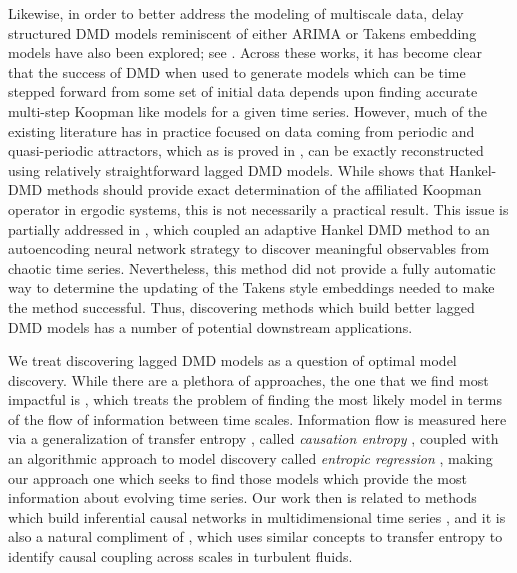 \documentclass[a4paper,11pt]{article}
\begin{document}
Likewise, in order to better address the modeling of multiscale data, delay structured DMD models reminiscent of either ARIMA or Takens embedding models have also been explored; see \cite{arbabi, clainche, duraisamy, champion2, kutz4, curtis_dldmd}.  Across these works, it has become clear that the success of DMD when used to generate models which can be time stepped forward from some set of initial data depends upon finding accurate multi-step Koopman like models for a given time series.  However, much of the existing literature has in practice focused on data coming from periodic and quasi-periodic attractors, which as is proved in \cite{duraisamy}, can be exactly reconstructed using relatively straightforward lagged DMD models.  While \cite{arbabi} shows that Hankel-DMD methods should provide exact determination of the affiliated Koopman operator in ergodic systems, this is not necessarily a practical result.  This issue is partially addressed in \cite{curtis_dldmd}, which coupled an adaptive Hankel DMD method to an autoencoding neural network strategy to discover meaningful observables from chaotic time series.  Nevertheless, this method did not provide a fully automatic way to determine the updating of the Takens style embeddings needed to make the method successful.  Thus, discovering methods which build better lagged DMD models has a number of potential downstream applications.  

We treat discovering lagged DMD models as a question of optimal model discovery.  While there are a plethora of approaches, the one that we find most impactful is \cite{bollt2}, which treats the problem of finding the most likely model in terms of the flow of information between time scales.  Information flow is measured here via a generalization of transfer entropy \cite{schreiber}, called {\it causation entropy} \cite{bollt}, coupled with an algorithmic approach to model discovery called {\it entropic regression} \cite{bollt2}, making our approach one which seeks to find those models which provide the most information about evolving time series.  Our work then is related to methods which build inferential causal networks in multidimensional time series \cite{idtxl2}, and it is also a natural compliment of \cite{lozano}, which uses similar concepts to transfer entropy to identify causal coupling across scales in turbulent fluids.  
\end{document}
